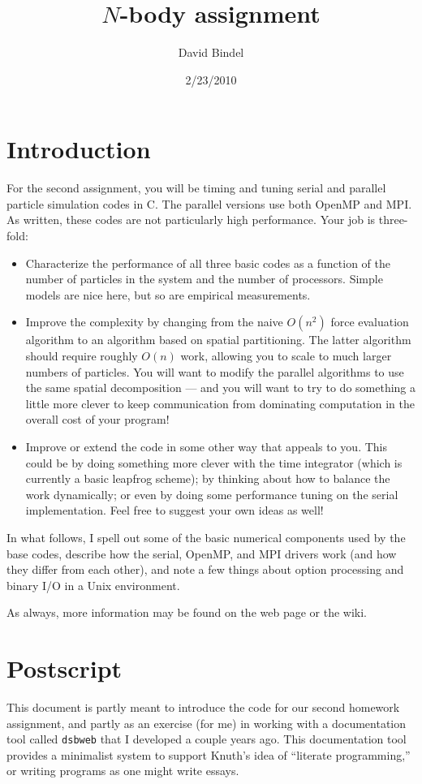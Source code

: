 \documentclass{article}
\title{$N$-body assignment}
\author{David Bindel}
\date{2/23/2010}
\begin{document}
\maketitle
\tableofcontents

\section{Introduction}

For the second assignment, you will be timing and tuning
serial and parallel particle simulation codes in C.  The
parallel versions use both OpenMP and MPI.  As written,
these codes are not particularly high performance.  Your
job is three-fold:
\begin{itemize}
\item
  Characterize the performance of all three basic codes as a
  function of the number of particles in the system and the
  number of processors.  Simple models are nice here, but
  so are empirical measurements.
\item
  Improve the complexity by changing from the naive $O(n^2)$
  force evaluation algorithm to an algorithm based on spatial
  partitioning.  The latter algorithm should require roughly $O(n)$
  work, allowing you to scale to much larger numbers of particles.
  You will want to modify the parallel algorithms to use the same
  spatial decomposition --- and you will want to try to do something
  a little more clever to keep communication from dominating computation
  in the overall cost of your program!
\item
  Improve or extend the code in some other way that appeals to you.
  This could be by doing something more clever with the time integrator
  (which is currently a basic leapfrog scheme); by thinking about how
  to balance the work dynamically; or even by doing some performance
  tuning on the serial implementation.  Feel free to suggest your own
  ideas as well!
\end{itemize}
In what follows, I spell out some of the basic numerical components
used by the base codes, describe how the serial, OpenMP, and MPI
drivers work (and how they differ from each other), and note a few
things about option processing and binary I/O in a Unix environment.

As always, more information may be found on the web page or the wiki.




\section{Postscript}

This document is partly meant to introduce the code for our second
homework assignment, and partly as an exercise (for me) in working
with a documentation tool called {\tt dsbweb} that I developed a
couple years ago.  This documentation tool provides a minimalist system
to support Knuth's idea of ``literate programming,'' or writing
programs as one might write essays.
\end{document}
